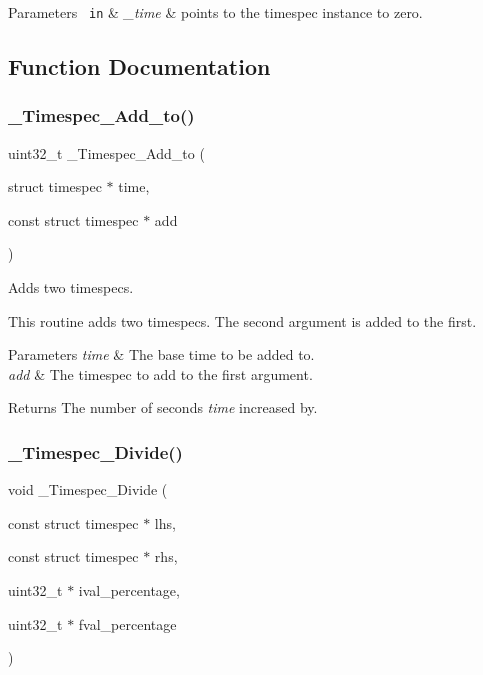 \begin{DoxyParams}[1]{Parameters}
\mbox{\texttt{ in}}  & {\em \+\_\+time} & points to the timespec instance to zero. \\
\hline
\end{DoxyParams}


\subsection{Function Documentation}
\mbox{\label{group__Timespec_ga87611505342ef38778226f80e0258368}} 
\subsubsection{\texorpdfstring{\_Timespec\_Add\_to()}{\_Timespec\_Add\_to()}}
{\footnotesize\ttfamily uint32\+\_\+t \+\_\+\+Timespec\+\_\+\+Add\+\_\+to (\begin{DoxyParamCaption}\item[{struct timespec $\ast$}]{time,  }\item[{const struct timespec $\ast$}]{add }\end{DoxyParamCaption})}



Adds two timespecs. 

This routine adds two timespecs. The second argument is added to the first.


\begin{DoxyParams}{Parameters}
{\em time} & The base time to be added to. \\
\hline
{\em add} & The timespec to add to the first argument.\\
\hline
\end{DoxyParams}
\begin{DoxyReturn}{Returns}
The number of seconds {\itshape time} increased by. 
\end{DoxyReturn}
\mbox{\label{group__Timespec_ga098b04e1bc31a65688df2971188fca06}} 
\subsubsection{\texorpdfstring{\_Timespec\_Divide()}{\_Timespec\_Divide()}}
{\footnotesize\ttfamily void \+\_\+\+Timespec\+\_\+\+Divide (\begin{DoxyParamCaption}\item[{const struct timespec $\ast$}]{lhs,  }\item[{const struct timespec $\ast$}]{rhs,  }\item[{uint32\+\_\+t $\ast$}]{ival\+\_\+percentage,  }\item[{uint32\+\_\+t $\ast$}]{fval\+\_\+percentage }\end{DoxyParamCaption})}



